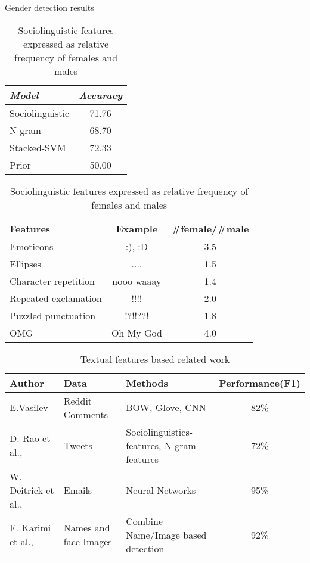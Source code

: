 \documentclass[runningheads]{llncs}
\begin{document}
	\begin{table}[!htb]
		\begin{minipage}{.5\linewidth}
			\caption{Gender detection results \cite{rao2010classifying}}
			\centering
			\begin{tabular}{| l | c |}
				\hline
				\textit{Model} & \textit{Accuracy} \\
				\hline
				Sociolinguistic & 71.76\\
				N-gram &  68.70\\
				Stacked-SVM & 72.33 \\
				Prior & 50.00 \\
				\hline
			\end{tabular}
			\label{table:text_results}
		\end{minipage}%
		\begin{minipage}{.5\linewidth}
			\centering
			\caption{Sociolinguistic features expressed as relative frequency of females and males \cite{rao2010classifying}}
			\begin{tabular}{| l | c | c |}
				\hline
				Features &  Example & \#female/\#male\\
				\hline
				Emoticons &  :), :D & 3.5\\
				Ellipses &  ....  & 1.5\\
				Character repetition & nooo waaay & 1.4\\
				Repeated exclamation & !!!!  &  2.0 \\
				Puzzled punctuation & !?!!??! & 1.8\\
				OMG & Oh My God & 4.0\\
				\hline
			\end{tabular}
			\label{table:frequency}
		\end{minipage} 
	\end{table}

	\begin{table}
		\caption{Textual features based related work }
		\begin{tabular}{| l | l | l | c | }
			\hline
			Author  &  Data  & Methods & Performance(F1)\\
			\hline
			E.Vasilev \cite{Vasilev:Thesis:2018} &  Reddit Comments & BOW, Glove, CNN & 82\%\\
			D. Rao et al., \cite{rao2010classifying} &  Tweets  & Sociolinguistics-features, N-gram-features & 72\%\\
			W. Deitrick et al., \cite{deitrick2012author} & Emails & Neural Networks & 95\%\\
			F. Karimi et al., \cite{karimi2016inferring} & Names and face Images  & Combine Name/Image based detection &  92\%\\
			\hline
		\end{tabular}
		\label{table:textual_work}
	\end{table}
\end{document}
